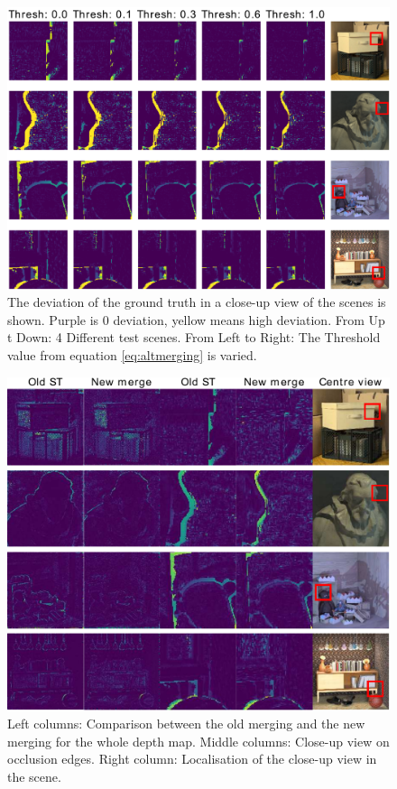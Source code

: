 \documentclass  [
  paper    = a4,
  BCOR     = 10mm,
  twoside,
  fontsize = 12pt,
  fleqn,
  toc      = bibnumbered,
  toc      = listofnumbered,
  numbers  = noendperiod,
  headings = normal,
  listof   = leveldown,
  version  = 3.03
]                                       {scrreprt}
\begin{document}
\begin{figure}
	\centering
	\includegraphics[width=1\linewidth]{images/choose_lower_difference-eps-converted-to}
	\caption[The dependence on the threshold difference.]{The deviation of the ground truth in a close-up view of the scenes is shown. Purple is 0 deviation, yellow means high deviation. From Up t Down: 4 Different test scenes. From Left to Right: The Threshold value from equation \ref{eq:altmerging} is varied.}
	\label{fig:chooselowerdifference}
\end{figure}


\begin{figure}
	\centering
	\includegraphics[width=1\linewidth]{images/choose_lower_results-eps-converted-to}
	\caption[Results from alternative merging of x- and y- direction]{Left columns: Comparison between the old merging and the new merging for the whole depth map. Middle columns: Close-up view on occlusion edges. Right column: Localisation of the close-up view in the scene.}
	\label{fig:chooselowerresults}
\end{figure}
\end{document}
